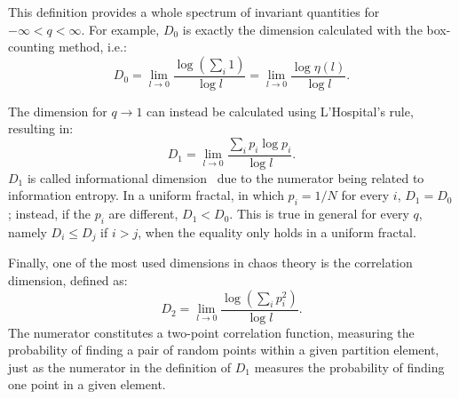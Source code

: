 This definition provides a whole spectrum of invariant quantities for $-\infty<q<\infty$.
For example, $D_0$ is exactly the dimension calculated with the box-counting method, i.e.:
\begin{equation}
    \label{eq: D_0}
    D_0=\lim_{l\rightarrow0}\frac{\log(\sum_i1)}{\log l}
    =\lim_{l\rightarrow0}\frac{\log\eta(l)}{\log l}.
\end{equation}

The dimension for $q\rightarrow1$ can instead be calculated using L'Hospital's rule, resulting in:
\begin{equation}
    \label{eq: D_1}
    D_1=\lim_{l\rightarrow0}\frac{\sum_i p_i\log p_i}{\log l}.
\end{equation}
$D_1$ is called informational dimension~\cite{ref:abarbanel_fourier_spectra} due to the numerator
being related to information entropy. In a uniform fractal, in which
$p_i=1/N$ for every $i$, $D_1=D_0$; instead, if the $p_i$ are different, $D_1<D_0$.
This is true in general for every $q$, namely $D_i\leq D_j$ if $i>j$, when the equality only
holds in a uniform fractal.

Finally, one of the most used dimensions in chaos theory is the correlation dimension, defined as:
\begin{equation}
    \label{eq: D_2}
    D_2=\lim_{l\rightarrow0}\frac{\log(\sum_i p_i^2)}{\log l}.
\end{equation}
The numerator constitutes a two-point correlation function, measuring the probability of finding a
pair of random points within a given partition element, just as the numerator in the definition of
$D_1$ measures the probability of finding one point in a given element.

